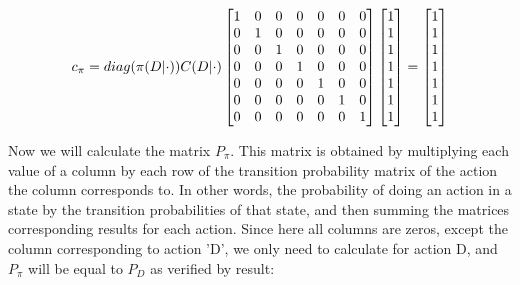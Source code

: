\documentclass{article}
\begin{document}
\begin{equation}
    \notag
    c_{\pi} = diag(\pi(D|\cdot))C(D|\cdot)
    \begin{bmatrix}
        1 & 0 & 0 & 0 & 0 & 0 & 0 \\
        0 & 1 & 0 & 0 & 0 & 0 & 0 \\
        0 & 0 & 1 & 0 & 0 & 0 & 0 \\
        0 & 0 & 0 & 1 & 0 & 0 & 0 \\
        0 & 0 & 0 & 0 & 1 & 0 & 0 \\
        0 & 0 & 0 & 0 & 0 & 1 & 0 \\
        0 & 0 & 0 & 0 & 0 & 0 & 1 \\
    \end{bmatrix}
    \begin{bmatrix}
        1 \\
        1 \\
        1 \\
        1 \\
        1 \\
        1 \\
        1 \\
    \end{bmatrix}
    = 
    \begin{bmatrix}
        1 \\
        1 \\
        1 \\
        1 \\
        1 \\
        1 \\
        1 \\
    \end{bmatrix}
\end{equation}

\bigskip

Now we will calculate the matrix $P_{\pi}$.
This matrix is obtained by multiplying each value of a column by each row of the transition probability matrix of the action the column corresponds to.
In other words, the probability of doing an action in a state by the transition probabilities of that state, and then summing the matrices corresponding results for each action.
Since here all columns are zeros, except the column corresponding to action 'D', we only need to calculate for action D, and $P_{\pi}$ will be equal to $P_{D}$ as verified by result:
\end{document}
